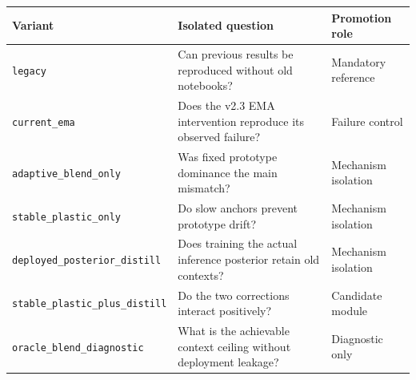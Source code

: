 \begin{tabularx}{\linewidth}{@{}l X l@{}}
\toprule
Variant & Isolated question & Promotion role \\
\midrule
\texttt{legacy} & Can previous results be reproduced without old notebooks? & Mandatory reference \\
\texttt{current\_ema} & Does the v2.3 EMA intervention reproduce its observed failure? & Failure control \\
\texttt{adaptive\_blend\_only} & Was fixed prototype dominance the main mismatch? & Mechanism isolation \\
\texttt{stable\_plastic\_only} & Do slow anchors prevent prototype drift? & Mechanism isolation \\
\texttt{deployed\_posterior\_distill} & Does training the actual inference posterior retain old contexts? & Mechanism isolation \\
\texttt{stable\_plastic\_plus\_distill} & Do the two corrections interact positively? & Candidate module \\
\texttt{oracle\_blend\_diagnostic} & What is the achievable context ceiling without deployment leakage? & Diagnostic only \\
\bottomrule
\end{tabularx}
